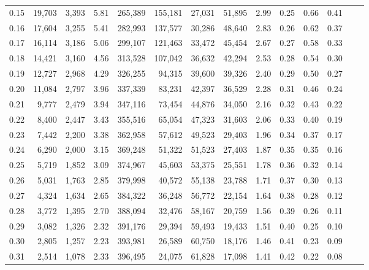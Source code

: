 \begin{tabular}{rrrrrrrrrrrrrr}
0.15 &  19,703 &  3,393 &    5.81 &  265,389 &  155,181 &  27,031 &  51,895 &  2.99 &  0.25 &  0.66 &      0.41 \\
0.16 &  17,604 &  3,255 &    5.41 &  282,993 &  137,577 &  30,286 &  48,640 &  2.83 &  0.26 &  0.62 &      0.37 \\
0.17 &  16,114 &  3,186 &    5.06 &  299,107 &  121,463 &  33,472 &  45,454 &  2.67 &  0.27 &  0.58 &      0.33 \\
0.18 &  14,421 &  3,160 &    4.56 &  313,528 &  107,042 &  36,632 &  42,294 &  2.53 &  0.28 &  0.54 &      0.30 \\
0.19 &  12,727 &  2,968 &    4.29 &  326,255 &   94,315 &  39,600 &  39,326 &  2.40 &  0.29 &  0.50 &      0.27 \\
0.20 &  11,084 &  2,797 &    3.96 &  337,339 &   83,231 &  42,397 &  36,529 &  2.28 &  0.31 &  0.46 &      0.24 \\
0.21 &   9,777 &  2,479 &    3.94 &  347,116 &   73,454 &  44,876 &  34,050 &  2.16 &  0.32 &  0.43 &      0.22 \\
0.22 &   8,400 &  2,447 &    3.43 &  355,516 &   65,054 &  47,323 &  31,603 &  2.06 &  0.33 &  0.40 &      0.19 \\
0.23 &   7,442 &  2,200 &    3.38 &  362,958 &   57,612 &  49,523 &  29,403 &  1.96 &  0.34 &  0.37 &      0.17 \\
0.24 &   6,290 &  2,000 &    3.15 &  369,248 &   51,322 &  51,523 &  27,403 &  1.87 &  0.35 &  0.35 &      0.16 \\
0.25 &   5,719 &  1,852 &    3.09 &  374,967 &   45,603 &  53,375 &  25,551 &  1.78 &  0.36 &  0.32 &      0.14 \\
0.26 &   5,031 &  1,763 &    2.85 &  379,998 &   40,572 &  55,138 &  23,788 &  1.71 &  0.37 &  0.30 &      0.13 \\
0.27 &   4,324 &  1,634 &    2.65 &  384,322 &   36,248 &  56,772 &  22,154 &  1.64 &  0.38 &  0.28 &      0.12 \\
0.28 &   3,772 &  1,395 &    2.70 &  388,094 &   32,476 &  58,167 &  20,759 &  1.56 &  0.39 &  0.26 &      0.11 \\
0.29 &   3,082 &  1,326 &    2.32 &  391,176 &   29,394 &  59,493 &  19,433 &  1.51 &  0.40 &  0.25 &      0.10 \\
0.30 &   2,805 &  1,257 &    2.23 &  393,981 &   26,589 &  60,750 &  18,176 &  1.46 &  0.41 &  0.23 &      0.09 \\
0.31 &   2,514 &  1,078 &    2.33 &  396,495 &   24,075 &  61,828 &  17,098 &  1.41 &  0.42 &  0.22 &      0.08 \\

\end{tabular}
